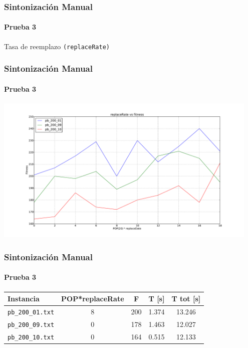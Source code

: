 \frame
{
\frametitle{Sintonización Manual}
\framesubtitle{Prueba 3}

\vspace{1cm}
\begin{center}
    Tasa de reemplazo \texttt{(replaceRate)}
\end{center}
}

\frame
{
\frametitle{Sintonización Manual}
\framesubtitle{Prueba 3}

\begin{center}
    \includegraphics[width=0.95\textwidth]{../doc/img/3.pdf}
\end{center}
}


\frame
{
\frametitle{Sintonización Manual}
\framesubtitle{Prueba 3}
\begin{center}
\begin{tabular}{|l|c|c|c|c|}
    \hline
    \textbf{Instancia} & \textbf{POP*replaceRate} & \textbf{F} & \textbf{T [s]} & \textbf{T tot [s]}\\\hline
    \texttt{pb\_200\_01.txt} & 8 & 200 & 1.374 & 13.246 \\\hline
    \texttt{pb\_200\_09.txt} & 0 & 178 & 1.463 & 12.027 \\\hline
    \texttt{pb\_200\_10.txt} & 0 & 164 & 0.515 & 12.133   \\\hline
\end{tabular}
\end{center}

}

